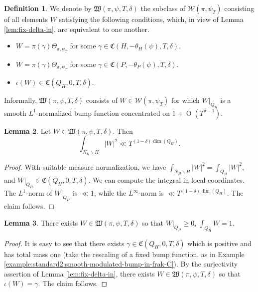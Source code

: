 \documentclass[reqno]{amsart}
\def\O{\operatorname{O}}
\theoremstyle{plain} \newtheorem{theorem} {Theorem}
\theoremstyle{definition} \newtheorem{definition} [theorem] {Definition}
\theoremstyle{itplain} %
\newtheorem{lemma}[theorem]{Lemma}
\numberwithin{equation}{section}
\numberwithin{theorem}{section}
\renewcommand{\geq}{\geqslant}
\begin{document}
\begin{definition}\label{defn:we-denote-mathfr-frakW}
  We denote by  $\mathfrak{W}(\pi,\psi,T,\delta)$ the subclass of $\mathcal{W}(\pi,\psi_T)$ consisting of all elements $W$ satisfying the following conditions, which, in view of Lemma \ref {lem:fix-delta-in}, are equivalent to one another.
  \begin{itemize}
  \item $W = \pi(\gamma) \Theta_{\pi,\psi_T}$ for some $\gamma \in \mathfrak{C}(H,-\theta_H(\psi),T,\delta)$.
  \item $W = \pi(\gamma) \Theta_{\pi,\psi_T}$ for some $\gamma \in \mathfrak{C}(P,-\theta_P(\psi),T,\delta)$.
  \item $\iota(W) \in \mathfrak{C}(Q_H, 0, T, \delta)$.
  \end{itemize}
\end{definition}
Informally, $\mathfrak{W}(\pi,\psi,T,\delta)$ consists of $W \in \mathcal{W}(\pi,\psi_T)$ for which $W|_{Q_H}$ is a smooth $L^1$-normalized bump function concentrated on $1 + \O(T^{\delta-1})$.

\begin{lemma}\label{lem:let-w-in-square-integral}
  Let $W \in \mathfrak{W}(\pi,\psi,T,\delta)$.  Then
  \begin{equation*}
    \int _{N_H \backslash H} |W|^2 \ll T^{(1- \delta) \dim(Q_H)}.
  \end{equation*}
\end{lemma}
\begin{proof}
  With suitable measure normalization, we have $\int_{N_H \backslash H} |W|^2 = \int_{Q_H} |W|^2$, and $W|_{Q_H} \in \mathfrak{C}(Q_H,0,T,\delta)$.  We can compute the integral in local coordinates.  The $L^1$-norm of $W|_{Q_H}$ is $\ll 1$, while the $L^\infty$-norm is $\ll T^{(1 - \delta) \dim(Q_H)}$.  The claim follows.
\end{proof}


\begin{lemma}\label{lem:there-exists-w-big-group-big}
  There exists $W \in \mathfrak{W}(\pi,\psi,T,\delta)$ so that $W|_{Q_H} \geq 0$, $\int_{Q_H} W = 1$.
\end{lemma}
\begin{proof}
  It is easy to see that there exists $\gamma \in \mathfrak{C}(Q_H,0,T,\delta)$ which is positive and has total mass one (take the rescaling of a fixed bump function, as in Example \ref{example:standard2:smooth-modulated-bump-in-frak-C}).  By the surjectivity assertion of Lemma \ref{lem:fix-delta-in}, there exists $W \in \mathfrak{W}(\pi,\psi,T,\delta)$ so that $\iota(W) = \gamma$.  The claim follows.
\end{proof}
\end{document}
